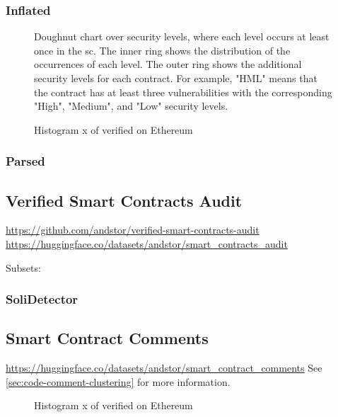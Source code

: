 \subsubsection{Inflated}
\label{sec:verified-smart-contracts-inflated}



\begin{figure}[ht]
    \centering
    
    \caption{Doughnut chart over security levels, where each level occurs at least once in the \acrshort{sc}. The inner ring shows the distribution of the occurrences of each level. The outer ring shows the additional security levels for each contract. For example, "HML" means that the contract has at least three vulnerabilities with the corresponding "High", "Medium", and "Low" security levels.}
\end{figure}


\begin{figure}[ht]
    \centering
    
    \caption{Histogram \small x of verified  on Ethereum}
\end{figure}


\subsubsection{Parsed}
\label{sec:verified-smart-contracts-parsed}



\subsection{Verified Smart Contracts Audit}
\label{sec:verified-smart-contracts-audit}
\url{https://github.com/andstor/verified-smart-contracts-audit}
\url{https://huggingface.co/datasets/andstor/smart_contracts_audit}

Subsets:
\subsubsection{SoliDetector}
\label{sec:verified-smart-contracts-audit-solidector}



\subsection{Smart Contract Comments}
\label{sec:verified-smart-contracts-comments}

\url{https://huggingface.co/datasets/andstor/smart_contract_comments}
See \cref{sec:code-comment-clustering} for more information.


\begin{figure}[ht]
    \centering
    
    \caption{Histogram \small x of verified  on Ethereum}
\end{figure}
